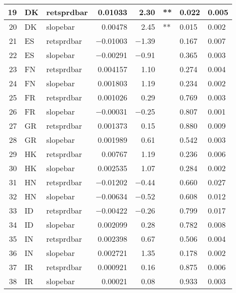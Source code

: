 \begin{longtable}{|r|l|l|r|r|l|l|l|}
   19 &    DK &    retsprdbar &    0.01033 &    2.30 &    ** &    0.022 &    0.005\\\hline
   20 &    DK &    slopebar &    0.00478 &    2.45 &    ** &    0.015 &    0.002\\\hline
   21 &    ES &    retsprdbar &    $-$0.01003 &    $-$1.39 &      &    0.167 &    0.007\\\hline
   22 &    ES &    slopebar &    $-$0.00291 &    $-$0.91 &      &    0.365 &    0.003\\\hline
   23 &    FN &    retsprdbar &    0.004157 &    1.10 &      &    0.274 &    0.004\\\hline
   24 &    FN &    slopebar &    0.001803 &    1.19 &      &    0.234 &    0.002\\\hline
   25 &    FR &    retsprdbar &    0.001026 &    0.29 &      &    0.769 &    0.003\\\hline
   26 &    FR &    slopebar &    $-$0.00031 &    $-$0.25 &      &    0.807 &    0.001\\\hline
   27 &    GR &    retsprdbar &    0.001373 &    0.15 &      &    0.880 &    0.009\\\hline
   28 &    GR &    slopebar &    0.001989 &    0.61 &      &    0.542 &    0.003\\\hline
   29 &    HK &    retsprdbar &    0.00767 &    1.19 &      &    0.236 &    0.006\\\hline
   30 &    HK &    slopebar &    0.002535 &    1.07 &      &    0.284 &    0.002\\\hline
   31 &    HN &    retsprdbar &    $-$0.01202 &    $-$0.44 &      &    0.660 &    0.027\\\hline
   32 &    HN &    slopebar &    $-$0.00634 &    $-$0.52 &      &    0.608 &    0.012\\\hline
   33 &    ID &    retsprdbar &    $-$0.00422 &    $-$0.26 &      &    0.799 &    0.017\\\hline
   34 &    ID &    slopebar &    0.002099 &    0.28 &      &    0.782 &    0.008\\\hline
   35 &    IN &    retsprdbar &    0.002398 &    0.67 &      &    0.506 &    0.004\\\hline
   36 &    IN &    slopebar &    0.002721 &    1.35 &      &    0.178 &    0.002\\\hline
   37 &    IR &    retsprdbar &    0.000921 &    0.16 &      &    0.875 &    0.006\\\hline
   38 &    IR &    slopebar &    0.00021 &    0.08 &      &    0.933 &    0.003\\\hline

\end{longtable}

